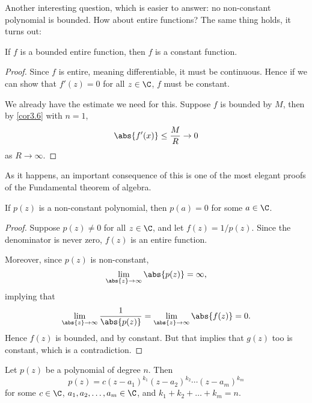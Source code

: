 Another interesting question, which is easier to answer: no non-constant polynomial is bounded.
How about entire functions?
The same thing holds, it turns out:

\begin{theorem}\label{thm3.9}
	If $f$ is a bounded entire function, then $f$ is a constant function.
\end{theorem}

\begin{proof}
	Since $f$ is entire, meaning differentiable, it must be continuous.
	Hence if we can show that $f'(z) = 0$ for all $z \in \C$, $f$ must be constant.

	We already have the estimate we need for this.
	Suppose $f$ is bounded by $M$, then by \autoref{cor3.6} with $n = 1$,
	\[
		\abs{f'(x)} \leq \frac{M}{R} \to 0
	\]
	as $R \to \infty$.
\end{proof}

As it happens, an important consequence of this is one of the most elegant proofs of the Fundamental theorem of algebra.

\begin{theorem}\label{thm3.10}
	If $p(z)$ is a non-constant polynomial, then $p(a) = 0$ for some $a \in \C$.
\end{theorem}

\begin{proof}
	Suppose $p(z) \neq 0$ for all $z \in \C$, and let $f(z) = 1 / p(z)$.
	Since the denominator is never zero, $f(z)$ is an entire function.

	Moreover, since $p(z)$ is non-constant,
	\[
		\lim_{\abs{z} \to \infty} \abs{p(z)} = \infty,
	\]
	implying that
	\[
		\lim_{\abs{z} \to \infty} \frac{1}{\abs{p(z)}} = \lim_{\abs{z} \to \infty} \abs{f(z)} = 0.
	\]
	Hence $f(z)$ is bounded, and by  constant.
	But that implies that $g(z)$ too is constant, which is a contradiction.
\end{proof}

\begin{corollary}\label{cor3.11}
	Let $p(z)$ be a polynomial of degree $n$.
	Then
	\[
		p(z) = c (z - a_1)^{k_1} (z - a_2)^{k_2} \dotsm (z - a_m)^{k_m}
	\]
	for some $c \in \C$, $a_1, a_2, \dots, a_m \in \C$, and $k_1 + k_2 + \dots + k_m = n$.
\end{corollary}

